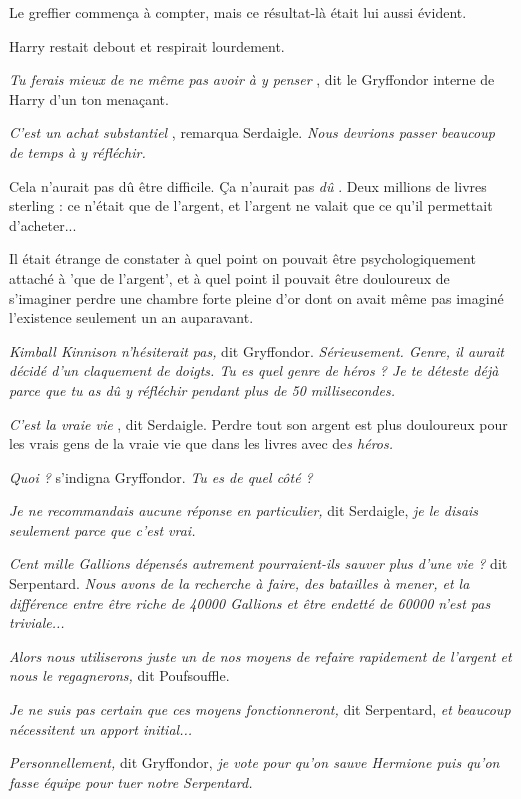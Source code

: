Le greffier commença à compter, mais ce résultat-là était lui aussi évident.

Harry restait debout et respirait lourdement.

\emph{Tu ferais mieux de ne même pas avoir à y penser} , dit le Gryffondor interne de Harry d'un ton menaçant.

\emph{C'est un achat substantiel} , remarqua Serdaigle. \emph{Nous devrions passer beaucoup de temps à y réfléchir.} 

Cela n'aurait pas dû être difficile. Ça n'aurait pas \emph{dû} . Deux millions de livres sterling : ce n'était que de l'argent, et l'argent ne valait que ce qu'il permettait d'acheter...

Il était étrange de constater à quel point on pouvait être psychologiquement attaché à 'que de l'argent', et à quel point il pouvait être douloureux de s'imaginer perdre une chambre forte pleine d'or dont on avait même pas imaginé l'existence seulement un an auparavant.

\emph{Kimball Kinnison n'hésiterait pas, } dit Gryffondor. \emph{Sérieusement. Genre, il aurait décidé d'un claquement de doigts. Tu es quel genre de héros ? Je te déteste déjà parce que tu as dû y réfléchir pendant plus de 50 millisecondes.} 

\emph{C'est la vraie vie} , dit Serdaigle. Perdre tout son argent est plus douloureux pour les vrais gens de la vraie vie que dans les livres avec de\emph{s héros.} 

\emph{Quoi ? } s'indigna Gryffondor. \emph{Tu es de quel côté ?} 

\emph{Je ne recommandais aucune réponse en particulier, } dit Serdaigle, \emph{je le disais seulement parce que c'est vrai.} 

\emph{Cent mille Gallions dépensés autrement pourraient-ils sauver plus d'une vie ? } dit Serpentard. \emph{Nous avons de la recherche à faire, des batailles à mener, et la différence entre être riche de 40000 Gallions et être endetté de 60000 n'est pas triviale...} 

\emph{Alors nous utiliserons juste un de nos moyens de refaire rapidement de l'argent et nous le regagnerons, } dit Poufsouffle.

\emph{Je ne suis pas certain que ces moyens fonctionneront, } dit Serpentard, \emph{et beaucoup nécessitent un apport initial...} 

\emph{Personnellement, } dit Gryffondor, \emph{je vote pour qu'on sauve Hermione puis qu'on fasse équipe pour tuer notre Serpentard.} 

